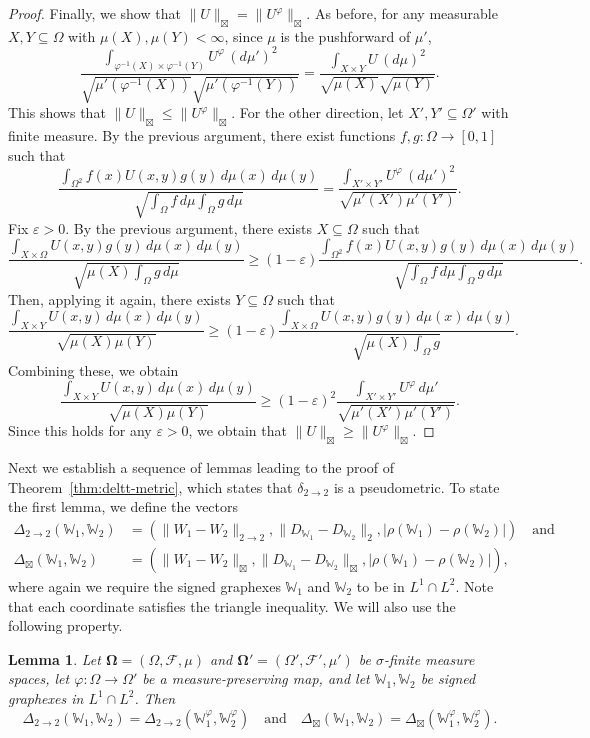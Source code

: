 \documentclass{amsart}
\numberwithin{equation}{section}
\numberwithin{figure}{section}
\newtheorem{lemma}[theorem]{Lemma}
\theoremstyle{definition}
\theoremstyle{remark}
\newcommand{\jbl}{{\boxtimes}}
\newcommand{\bOmega}{{\mathbf{\Omega}}}
\newcommand{\cW}{\mathbb{W}}
\newcommand{\cF}{\mathcal{F}}
\newcommand{\deltt}{\delta_{2\to 2}}
\begin{document}
\begin{proof}
Finally, we show that $\|U\|_\jbl=\|U^\varphi\|_\jbl$. As before, for any
measurable $X,Y \subseteq \Omega$ with $\mu(X),\mu(Y)<\infty$, since $\mu$ is
the pushforward of $\mu'$,
\[\frac{\int_{\varphi^{-1}(X) \times \varphi^{-1}(Y)}U^\varphi \,(d\mu')^2}{\sqrt{\mu'(\varphi^{-1}(X))}\sqrt{\mu'(\varphi^{-1}(Y))}}=\frac{\int_{X \times Y} U \,(d\mu)^2}{\sqrt{\mu(X)} \sqrt{\mu(Y)}}
.\] This shows that $\|U\|_\jbl \le \|U^\varphi\|_\jbl$. For the other
direction, let $X',Y' \subseteq \Omega'$ with finite measure. By the previous
argument, there exist functions $f,g\colon\Omega \to [0,1]$ such that
\[\frac{\int_{\Omega^2}f(x)U(x,y)g(y) \,d\mu(x)\,d\mu(y)}{\sqrt{\int_\Omega f \,d\mu \int_\Omega g \,d\mu}} = \frac{\int_{X' \times Y'}U^\varphi \,(d\mu')^2}{\sqrt{\mu'(X')\mu'(Y')}}
.\] Fix $\varepsilon>0$. By the previous argument, there exists $X \subseteq
\Omega$ such that
\[\frac{\int_{X \times \Omega}U(x,y)g(y) \,d\mu(x)\,d\mu(y)}{\sqrt{\mu(X) \int_\Omega g \,d\mu}} \ge
(1-\varepsilon)\frac{\int_{\Omega^2}f(x)U(x,y)g(y) \,d\mu(x)\,d\mu(y)}{\sqrt{\int_\Omega f \,d\mu \int_\Omega g \,d\mu}}
.\]
Then, applying it again, there exists $Y \subseteq \Omega$ such that
\[\frac{\int_{X \times Y}U(x,y) \,d\mu(x)\,d\mu(y)}{\sqrt{\mu(X)\mu(Y)}} \ge (1-\varepsilon)\frac{\int_{X \times \Omega}U(x,y)g(y) \,d\mu(x)\,d\mu(y)}{\sqrt{\mu(X) \int_\Omega g}}
.\]
Combining these, we obtain
\[\frac{\int_{X \times Y}U(x,y) \,d\mu(x)\,d\mu(y)}{\sqrt{\mu(X)\mu(Y)}} \ge (1-\varepsilon)^2\frac{\int_{X' \times Y'}U^\varphi \,d\mu'}{\sqrt{\mu'(X')\mu'(Y')}}
.\] Since this holds for any $\varepsilon>0$, we obtain that $\|U\|_\jbl \ge
\|U^\varphi\|_\jbl$.
\end{proof}

Next we establish a sequence of lemmas leading to the proof of
Theorem~\ref{thm:deltt-metric}, which states that $\deltt$ is a pseudometric.
To state the first lemma, we define the vectors
\begin{align*}
\Delta_{2\to 2}(\cW_1,\cW_2)
&= \left( \|W_1-W_2\|_{2 \rightarrow 2}, \|D_{\cW_1}-D_{\cW_2}\|_2,
\left|
\rho(\cW_1)-\rho(\cW_2)\right|\right)
\quad\text{and}
\\
\Delta_{\jbl}(\cW_1,\cW_2)
&= \left( \|W_1-W_2\|_{\jbl}, \|D_{\cW_1}-D_{\cW_2}\|_\jbl,
\left|\rho(\cW_1)-\rho(\cW_2)\right|\right),
\end{align*}
where again we require the signed graphexes $\cW_1$ and $\cW_2$ to be in
$L^1\cap L^2$. Note that each coordinate satisfies the triangle inequality.
We will also use the following property.

\begin{lemma} \label{lemmapullbacksame}
Let $\bOmega=(\Omega,\cF,\mu)$ and $\bOmega'=(\Omega',\cF',\mu')$ be
$\sigma$-finite measure spaces, let $\varphi\colon \Omega \rightarrow
\Omega'$ be a measure-preserving map, and let $\cW_1,\cW_2$ be
signed graphexes in $L^1\cap L^2$.
Then
\[
\Delta_{2\to 2}(\cW_1,\cW_2)=\Delta_{2\to 2}(\cW_1^\varphi,\cW_2^\varphi)
\quad\text{and}\quad
\Delta_{\jbl}(\cW_1,\cW_2)=\Delta_{\jbl}(\cW_1^\varphi,\cW_2^\varphi).
\]
\end{lemma}
\end{document}
